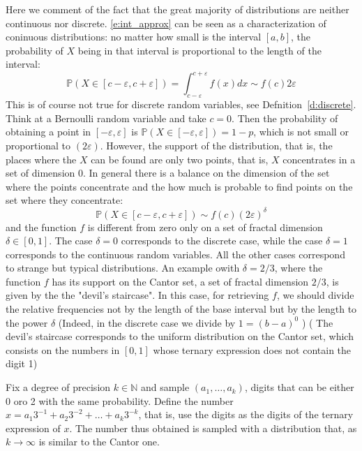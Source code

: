 	Here we comment of the fact that the great majority of distributions are neither continuous nor discrete. 
	\eqref{e:int_approx} can be seen as a characterization of coninuous distributions: no matter how small is the interval $[a,b ]$, the probability of $X$ being in that interval is proportional to the length of the interval: 
			\begin{equation}
				\label{e:density_eps}
				\mathbb P(X \in [c- \varepsilon, c + \varepsilon]) = \int_{c - \varepsilon}^{c + \varepsilon} f(x)dx \sim f(c) 2\varepsilon 
			\end{equation}
	This is of course not true for discrete random variables, see Defnition~\ref{d:discrete}. Think at a Bernoulli random variable and take $c = 0$. Then the probability of obtaining a point in $[- \varepsilon, \varepsilon ]$ is $\mathbb P( X \in [-\varepsilon, \varepsilon ] ) = 1-p$, which is not small or proportional to $(2\varepsilon)$. However, the support of the distribution, that is, the places where the $X$ can be found are only two points, that is, $X$ concentrates in a set of dimension 0.  In general there is a balance on the dimension of the set where the points concentrate and the how much is probable to find points on the set where they concentrate: 
	\begin{equation}
		\mathbb P( X \in [c - \varepsilon , c + \varepsilon ]) \sim f(c) (2\varepsilon )^\delta 
	\end{equation}
	and the function $f$ is different from zero only on a set of fractal dimension $\delta \in [0,1]$. The case $\delta =0$ corresponds to the discrete case, while the case $\delta = 1$ corresponds to the continuous random variables. All the other cases correspond to strange but typical distributions. An example owith $\delta = 2/3$, where the function $f$ has its support on the Cantor set, a set of fractal dimension $2/3$, is given by the the "devil's staircase". In this case, for retrieving $f$, we should divide the relative frequencies not by the length of the base interval but by the length to the power $\delta$ (Indeed, in the discrete case we divide by $1 = (b-a)^0$ ) ( The devil's staircase  corresponds to the uniform distribution on the Cantor set, which consists on the numbers in $[0,1]$ whose ternary expression does not contain the digit 1)

	\begin{ExerciseList}
		\Exercise Fix a degree of precision $k \in \mathbb N$ and sample  $(a_1,\ldots, a_k)$, digits that can be either 0 oro 2 with the same probability. Define the number $x = a_1 3^{-1} + a_2 3^{-2}  + \ldots + a_k 3^{-k}$, that is, use the digits as the digits of the ternary expression of $x$. The number thus obtained is sampled with a distribution that, as $k\to \infty$ is similar to the Cantor one. 
	\end{ExerciseList}
